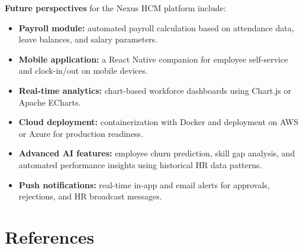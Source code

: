 \documentclass[12pt,a4paper]{report}
\begin{document}
\textbf{Future perspectives} for the Nexus HCM platform include:

\begin{itemize}
  \item \textbf{Payroll module:} automated payroll calculation based on attendance data,
    leave balances, and salary parameters.
  \item \textbf{Mobile application:} a React Native companion for employee self-service
    and clock-in/out on mobile devices.
  \item \textbf{Real-time analytics:} chart-based workforce dashboards using Chart.js
    or Apache ECharts.
  \item \textbf{Cloud deployment:} containerization with Docker and deployment on AWS
    or Azure for production readiness.
  \item \textbf{Advanced AI features:} employee churn prediction, skill gap analysis,
    and automated performance insights using historical HR data patterns.
  \item \textbf{Push notifications:} real-time in-app and email alerts for approvals,
    rejections, and HR broadcast messages.
\end{itemize}

\newpage

\chapter*{References}
\end{document}
